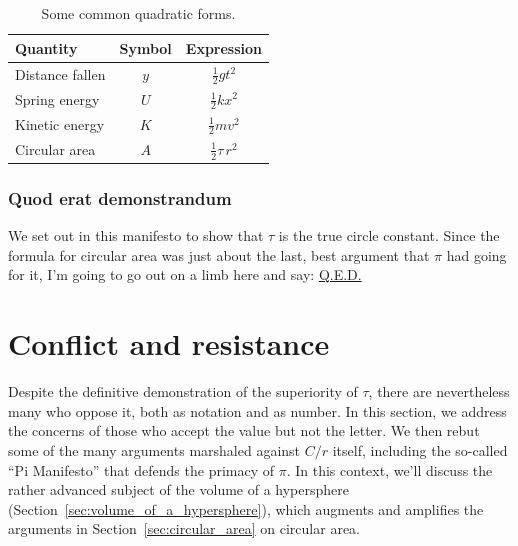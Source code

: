 {\begin{table}
\begin{center}
\begin{tabular}{lcc}
Quantity & Symbol & Expression \\ \hline
Distance fallen & $y$ & $\textstyle{\frac{1}{2}}gt^2$ \smallskip \\
Spring energy & $U$ & $\textstyle{\frac{1}{2}}kx^2$ \smallskip \\
Kinetic energy & $K$ & $\textstyle{\frac{1}{2}}mv^2$ \smallskip \\
Circular area & $A$ & $\textstyle{\frac{1}{2}}\tau\,r^2$
\end{tabular}
\end{center}
\caption{Some common quadratic forms.\label{table:quadratic_forms}}
\end{table}

    \subsubsection{Quod erat demonstrandum} %
    \label{sec:quod_erat_demonstrandum}

We set out in this manifesto to show that $\tau$ is the true circle constant. Since the formula for circular area was just about the last, best argument that $\pi$ had going for it, I'm going to go out on a limb here and say: \href{https://en.wikipedia.org/wiki/Q.E.D.}{Q.E.D.}



\section{Conflict and resistance} %
\label{sec:conflict_and_resistance}

Despite the definitive demonstration of the superiority of $\tau$, there are nevertheless many who oppose it, both as notation and as number. In this section, we address the concerns of those who accept the value but not the letter. We then rebut some of the many arguments marshaled against $C/r$ itself, including the so-called ``Pi Manifesto'' that defends the primacy of $\pi$. In this context, we'll discuss the rather advanced subject of the volume of a hypersphere (Section~\ref{sec:volume_of_a_hypersphere}), which augments and amplifies the arguments in Section~\ref{sec:circular_area} on circular area.

}
